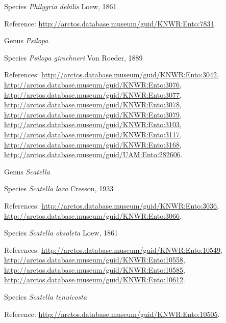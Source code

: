 \documentclass[9pt, article]{memoir}
\begin{document}
\begin{multicols}{2}
\vspace{6pt}\noindent\hspace{36pt}Species \textit{Philygria debilis} Loew, 1861


Reference: 
\url{http://arctos.database.museum/guid/KNWR:Ento:7831}.

\vspace{6pt}\noindent\hspace{30pt}Genus \textit{Psilopa}


\vspace{6pt}\noindent\hspace{36pt}Species \textit{Psilopa girschneri} Von Roeder, 1889


References: 
\url{http://arctos.database.museum/guid/KNWR:Ento:3042}, 
\url{http://arctos.database.museum/guid/KNWR:Ento:3076}, 
\url{http://arctos.database.museum/guid/KNWR:Ento:3077}, 
\url{http://arctos.database.museum/guid/KNWR:Ento:3078}, 
\url{http://arctos.database.museum/guid/KNWR:Ento:3079}, 
\url{http://arctos.database.museum/guid/KNWR:Ento:3103}, 
\url{http://arctos.database.museum/guid/KNWR:Ento:3117}, 
\url{http://arctos.database.museum/guid/KNWR:Ento:3168}, 
\url{http://arctos.database.museum/guid/UAM:Ento:282606}.

\vspace{6pt}\noindent\hspace{30pt}Genus \textit{Scatella}


\vspace{6pt}\noindent\hspace{36pt}Species \textit{Scatella laxa} Cresson, 1933


References: 
\url{http://arctos.database.museum/guid/KNWR:Ento:3036}, 
\url{http://arctos.database.museum/guid/KNWR:Ento:3066}.

\vspace{6pt}\noindent\hspace{36pt}Species \textit{Scatella obsoleta} Loew, 1861


References: 
\url{http://arctos.database.museum/guid/KNWR:Ento:10549}, 
\url{http://arctos.database.museum/guid/KNWR:Ento:10558}, 
\url{http://arctos.database.museum/guid/KNWR:Ento:10585}, 
\url{http://arctos.database.museum/guid/KNWR:Ento:10612}.

\vspace{6pt}\noindent\hspace{36pt}Species \textit{Scatella tenuicosta}


Reference: 
\url{http://arctos.database.museum/guid/KNWR:Ento:10505}.


\end{multicols}
\end{document}
